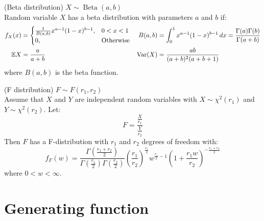 \documentclass{huhtakm-template-book}
\newcommand{\expect}{\mathbb{E}}
\DeclareMathOperator{\Beta}{Beta}
\DeclareMathOperator{\Var}{Var}
\begin{document}
\begin{seg}(Beta distribution) $X\sim\Beta(a,b)$\\
	Random variable $X$ has a beta distribution with parameters $a$ and $b$ if:
	\begin{align*}
		f_{X}(x)&=\begin{cases}
			\frac{1}{B(a,b)}x^{a-1}(1-x)^{b-1}, &0<x<1\\
			0, &\text{Otherwise}
		\end{cases} & B(a,b)&=\intlu{0}{1}x^{a-1}(1-x)^{b-1}\,dx=\frac{\Gamma(a)\Gamma(b)}{\Gamma(a+b)}\\
		\expect{X}&=\frac{a}{a+b} & \Var(X)&=\frac{ab}{(a+b)^{2}(a+b+1)}
	\end{align*}
	where $B(a,b)$ is the beta function.
\end{seg}
\begin{seg}(F distribution) $F\sim F(r_{1},r_{2})$\\
	Assume that $X$ and $Y$ are independent random variables with $X\sim\chi^{2}(r_{1})$ and $Y\sim\chi^{2}(r_{2})$. Let:
	\begin{equation*}
		F=\frac{\frac{X}{r_{1}}}{\frac{Y}{r_{2}}}
	\end{equation*}
	Then $F$ has a F-distribution with $r_{1}$ and $r_{2}$ degrees of freedom with:
	\begin{equation*}
		f_{F}(w)=\frac{\Gamma\left(\frac{r_{1}+r_{2}}{2}\right)}{\Gamma\left(\frac{r_{1}}{2}\right)\Gamma\left(\frac{r_{2}}{2}\right)}\left(\frac{r_{1}}{r_{2}}\right)^{\frac{r_{1}}{2}}w^{\frac{r_{1}}{2}-1}\left(1+\frac{r_{1}w}{r_{2}}\right)^{-\frac{r_{1}+r_{2}}{2}}
	\end{equation*}
	where $0<w<\infty$.
\end{seg}

\chapter{Generating function}
\end{document}
